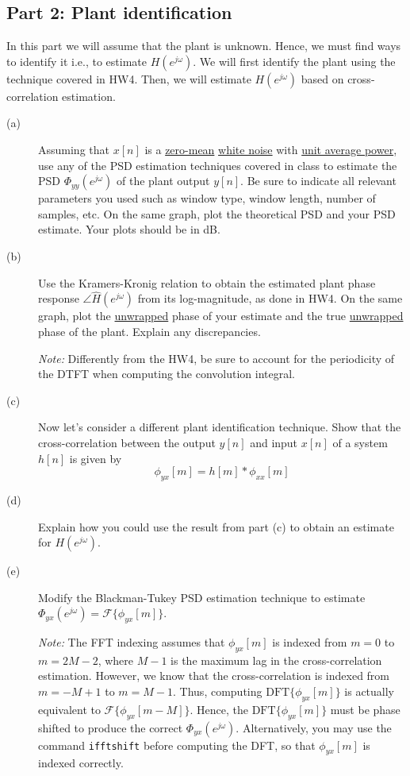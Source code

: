 \documentclass[12pt]{report}
\begin{document}
\subsection*{Part 2: Plant identification}
In this part we will assume that the plant is unknown. Hence, we must find ways to identify it i.e., to estimate $H(e^{j\omega})$. We will first identify the plant using the technique covered in HW4. Then, we will estimate $H(e^{j\omega})$ based on cross-correlation estimation.
\begin{description}
	\item [(a)] Assuming that $x[n]$ is a \underline{zero-mean} \underline{white noise} with \underline{unit average power}, use any of the PSD estimation techniques covered in class to estimate the PSD $\Phi_{yy}(e^{j\omega})$ of the plant output $y[n]$. Be sure to indicate all relevant parameters you used such as window type, window length, number of samples, etc. On the same graph, plot the theoretical PSD and your PSD estimate. Your plots should be in dB.
	
	\item [(b)] Use the Kramers-Kronig relation to obtain the estimated plant phase response $\angle \hat{H}(e^{j\omega})$ from its log-magnitude, as done in HW4. On the same graph, plot the \underline{unwrapped} phase of your estimate and the true \underline{unwrapped} phase of the plant. Explain any discrepancies.
	
	\textit{Note:} Differently from the HW4, be sure to account for the periodicity of the DTFT when computing the convolution integral. 
	
	\item [(c)] Now let's consider a different plant identification technique. Show that the cross-correlation between the output $y[n]$ and input $x[n]$ of a system $h[n]$ is given by
	\begin{equation}
		\phi_{yx}[m] = h[m]\ast \phi_{xx}[m]
	\end{equation}
		
	\item [(d)] Explain how you could use the result from part (c) to obtain an estimate for $H(e^{j\omega})$.
	
	\item [(e)] Modify the Blackman-Tukey PSD estimation technique to estimate $\Phi_{yx}(e^{j\omega}) = \mathcal{F}\{\phi_{yx}[m]\}$. 
	
	\textit{Note:} The FFT indexing assumes that $\phi_{yx}[m]$ is indexed from $m = 0$ to $m = 2M-2$, where $M-1$ is the maximum lag in the cross-correlation estimation. However, we know that the cross-correlation is indexed from $m = -M+1$ to $m = M-1$. Thus, computing $\mathrm{DFT}\{\phi_{yx}[m]\}$ is actually equivalent to $\mathcal{F}\{\phi_{yx}[m-M]\}$. Hence, the $\mathrm{DFT}\{\phi_{yx}[m]\}$ must be phase shifted to produce the correct $\Phi_{yx}(e^{j\omega})$. Alternatively, you may use the command \texttt{ifftshift} before computing the DFT, so that $\phi_{yx}[m]$ is indexed correctly.
	

\end{description}
\end{document}
